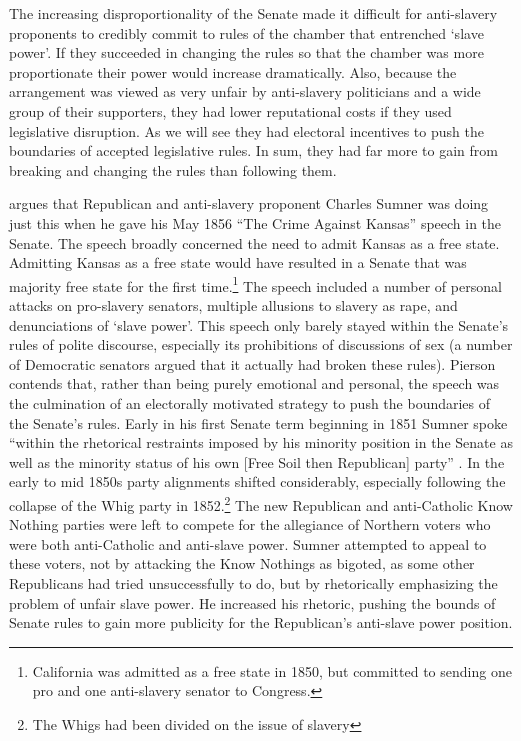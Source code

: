 \documentclass[a4paper]{article}\usepackage[]{graphicx}\usepackage[]{color}
\begin{document}
The increasing disproportionality of the Senate made it difficult for anti-slavery proponents to credibly commit to rules of the chamber that entrenched `slave power'. If they succeeded in changing the rules so that the chamber was more proportionate their power would increase dramatically. Also, because the arrangement was viewed as very unfair by anti-slavery politicians and a wide group of their supporters, they had lower reputational costs if they used legislative disruption. As we will see they had electoral incentives to push the boundaries of accepted legislative rules. In sum, they had far more to gain from breaking and changing the rules than following them.

\cite{Pierson1995} argues that Republican and anti-slavery proponent Charles Sumner was doing just this when he gave his May 1856 ``The Crime Against Kansas'' speech in the Senate. The speech broadly concerned the need to admit Kansas as a free state. Admitting Kansas as a free state would have resulted in a Senate that was majority free state for the first time.\footnote{California was admitted as a free state in 1850, but committed to sending one pro and one anti-slavery senator to Congress.} The speech included a number of personal attacks on pro-slavery senators, multiple allusions to slavery as rape, and denunciations of `slave power'. This speech only barely stayed within the Senate's rules of polite discourse, especially its prohibitions of discussions of sex (a number of Democratic senators argued that it actually had broken these rules). Pierson contends that, rather than being purely emotional and personal, the speech was the culmination of an electorally motivated strategy to push the boundaries of the Senate's rules. Early in his first Senate term beginning in 1851 Sumner spoke ``within the rhetorical restraints imposed by his minority position in the Senate as well as the minority status of his own [Free Soil then Republican] party'' \cite[534]{Pierson1995}. In the early to mid 1850s party alignments shifted considerably, especially following the collapse of the Whig party in 1852.\footnote{The Whigs had been divided on the issue of slavery} The new Republican and anti-Catholic Know Nothing parties were left to compete for the allegiance of Northern voters who were both anti-Catholic and anti-slave power. Sumner attempted to appeal to these voters, not by attacking the Know Nothings as bigoted, as some other Republicans had tried unsuccessfully to do, but by rhetorically emphasizing the problem of unfair slave power. He increased his rhetoric, pushing the bounds of Senate rules to gain more publicity for the Republican's anti-slave power position.
\end{document}
